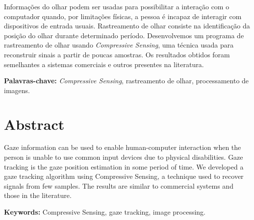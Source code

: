 \documentclass[12pt]{report}
\newcommand{\oldc}[1]{}
\newcommand{\newc}[1]{#1}
\begin{document}
Informações do olhar podem ser usadas para \oldc{melhorar a experiência do usuário ou }possibilitar a interação com o computador quando, por limitações físicas, a pessoa é incapaz de interagir com dispositivos de entrada usuais. Rastreamento de olhar consiste na identificação da posição do olhar durante determinado período. Desenvolvemos um programa de rastreamento de olhar usando \textit{Compressive Sensing}, uma técnica usada para reconstruir sinais a partir de poucas amostras. Os resultados obtidos foram semelhantes \oldc{aos}\newc{a sistemas comerciais e outros} presentes na literatura.

\noindent \textbf{Palavras-chave:} \textit{Compressive Sensing}, rastreamento de olhar, processamento de imagens.



\chapter*{Abstract}

Gaze information can be used to \oldc{improve user experience or }enable human-computer interaction when the person is unable to use common input devices due to physical disabilities. Gaze tracking is the gaze position estimation in some period of time.  We developed a gaze tracking algorithm using Compressive Sensing, a technique used to recover signals from few samples. The results are similar to \newc{commercial systems and }those in the literature.

\noindent \textbf{Keywords:} Compressive Sensing, gaze tracking, image processing.

\tableofcontents    %









%


\end{document}

